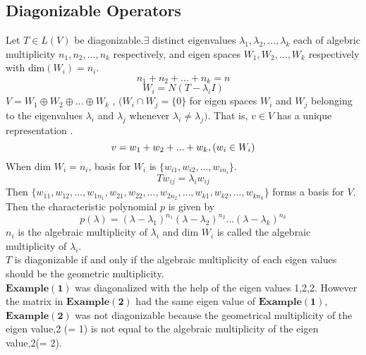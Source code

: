 \documentclass[12pt]{article}
\theoremstyle{definition}
\begin{document}
	  \subsection{Diagonizable Operators} 
	  Let $T \in L(V)$ be diagonizable.$\exists$ distinct eigenvalues $\lambda_{1},\lambda_{2},...,\lambda_{k}$ each of algebric multiplicity $n_1,n_2,...,n_k$ respectively, and eigen spaces $W_1,W_2,...,W_k$ respectively with dim$(W_i) = n_i.$
	  $$n_1+n_2+...+n_k = n$$
	  $$W_i = N(T-\lambda_i I)$$
	  $V = W_1\oplus W_2\oplus...\oplus W_k$ ,\space 
	  $(W_i\cap W_j =\{0\}$ for eigen spaces $W_i$ and $W_j$ belonging to the eigenvalues $\lambda_{i}$ and $\lambda_{j}$ whenever $\lambda_{i} \neq \lambda_{j}).$
	  That is, $v \in V$ has a unique representation
	 .
	 $$ v = w_1+w_2+...+w_k , \space (w_i\in W_i)$$
	 When dim $W_i = n_i$, basis for $W_i$ is $\{w_{i1},w_{i2},...,w_{in_i}\}$.
	 $$Tw_{ij} = \lambda_{i}w_{ij}$$
	 Then $\{w_{11},w_{12},...,w_{1n_1},w_{21},w_{22},...,w_{2n_2},...,w_{k1},w_{k2},...,w_{kn_k}\}$ forms a basis for $V$.\\
	 Then the characteristic polynomial $p$ is given by $$p(\lambda)=(\lambda-\lambda_{1})^{n_1}(\lambda-\lambda_{2})^{n_2}...(\lambda-\lambda_{k})^{n_k}$$
	 $n_i$ is the algebraic multiplicity of $\lambda_{i}$ and dim $W_i$ is called the algebraic multiplicity of $\lambda_{i}$.\\
	 $T$ is diagonizable if and only if the algebraic multiplicity of each eigen values should be the geometric multiplicity.\\
	 $\mathbf{Example(1)}$ was diagonalized with the help of the eigen values 1,2,2. However the matrix in $\mathbf{Example(2)}$ had the same eigen value of $\mathbf{Example(1)}$,
	  $\mathbf{Example(2)}$ was not diagonizable because the geometrical multiplicity of the eigen value,2 (= 1) is not equal to the algebraic multiplicity of the eigen value,2(= 2).
	 \\
	 
\end{document}
